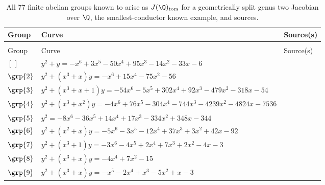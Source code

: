 \begingroup\scriptsize
\renewcommand{\arraystretch}{1.18}
\begin{longtable}{@{}>{\raggedright\arraybackslash}p{1.35cm}
 >{\raggedright\arraybackslash}p{}
 >{\raggedright\arraybackslash}p{1.25cm}@{}}
\caption{All 77 finite abelian groups known to arise as $J(\Q)_{\mathrm{tors}}$ for a geometrically split genus two Jacobian over \(\Q\), the
smallest-conductor known example, and sources.\label{tab:splitcensus}}\\
\toprule
Group & Curve & Source(s)\\
\midrule
\endfirsthead
\multicolumn{3}{@{}l}{{\normalsize\emph{Table~\ref{tab:splitcensus} (continued)}}}\\
\toprule
Group & Curve & Source(s)\\
\midrule
\endhead
\midrule
\endfoot
\bottomrule
\endlastfoot
$[\,]$ & \href{https://www.lmfdb.org/Genus2Curve/Q/1083/b/390963/1}{$y^2 + y = -x^{6}+3x^{5}-50x^{4}+95x^{3}-14x^{2}-33x-6$} & \cite{BSSVY}\\
$\grp{2}$ & \href{https://www.lmfdb.org/Genus2Curve/Q/336/a/172032/1}{$y^2 + (x^{3}+x)y = -x^{6}+15x^{4}-75x^{2}-56$} & \cite{BSSVY}\\
$\grp{3}$ & \href{https://alpha.lmfdb.org/Genus2Curve/Q/?jump=[[-54,-318,-479,92,302,-5,-54],[1,1,0,1]]}{$y^2 + (x^{3}+x+1)y = -54x^{6}-5x^{5}+302x^{4}+92x^{3}-479x^{2}-318x-54$} & \cite{BSSVY}\\
$\grp{4}$ & \href{https://alpha.lmfdb.org/Genus2Curve/Q/?jump=[[-7536,-4824,-4239,-744,-304,76,-4],[0,0,1,1]]}{$y^2 + (x^{3}+x^{2})y = -4x^{6}+76x^{5}-304x^{4}-744x^{3}-4239x^{2}-4824x-7536$} & \cite{BSSVY}\\
$\grp{5}$ & \href{https://alpha.lmfdb.org/Genus2Curve/Q/?jump=[[-344,348,-334,17,14,-36,-8],[0]]}{$y^2 = -8x^{6}-36x^{5}+14x^{4}+17x^{3}-334x^{2}+348x-344$} & \cite{BSSVY}\\
$\grp{6}$ & \href{https://alpha.lmfdb.org/Genus2Curve/Q/?jump=[[-92,42,3,37,-12,-3,-5],[0,1,1]]}{$y^2 + (x^{2}+x)y = -5x^{6}-3x^{5}-12x^{4}+37x^{3}+3x^{2}+42x-92$} & \cite{BSSVY}\\
$\grp{7}$ & \href{https://alpha.lmfdb.org/Genus2Curve/Q/?jump=[[-3,-4,2,7,2,-4,-3],[1,0,0,1]]}{$y^2 + (x^{3}+1)y = -3x^{6}-4x^{5}+2x^{4}+7x^{3}+2x^{2}-4x-3$} & \cite{BSSVY}\\
$\grp{8}$ & \href{https://alpha.lmfdb.org/Genus2Curve/Q/?jump=[[-15,0,7,0,-4],[0,1,0,1]]}{$y^2 + (x^{3}+x)y = -4x^{4}+7x^{2}-15$} & \cite{BSSVY}\\
$\grp{9}$ & \href{https://alpha.lmfdb.org/Genus2Curve/Q/?jump=[[-3,1,-5,1,-2,-1],[0,1,0,1]]}{$y^2 + (x^{3}+x)y = -x^{5}-2x^{4}+x^{3}-5x^{2}+x-3$} & \cite{BSSVY}\\

\end{longtable}
